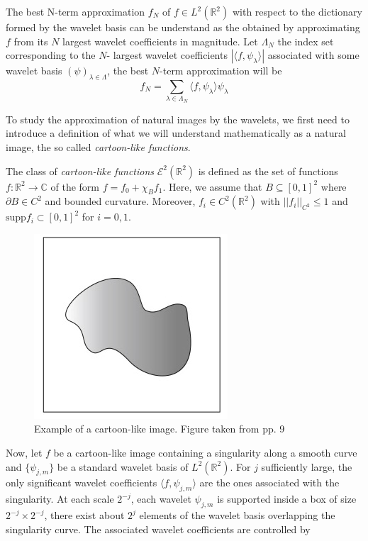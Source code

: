 \bigskip

The best N-term approximation $f_N$ of $f\in L^2(\mathbb{R}^2)$ with respect to the dictionary formed by the wavelet basis can be understand as the obtained by approximating $f$ from its $N$ largest wavelet coefficients in magnitude. Let $\Lambda_N$ the index set corresponding to the $N$- largest wavelet coefficients $|\langle f,\psi_{\lambda}\rangle|$ associated with some wavelet basis $(\psi)_{\lambda\in\Lambda}$, the best $N$-term approximation will be
$$
f_N=\sum_{\lambda\in\Lambda_N}\langle f,\psi_{\lambda}\rangle\psi_{\lambda}
$$

\bigskip

To study the approximation of natural images by the wavelets, we first need to introduce a definition of what we will understand mathematically as a natural image, the so called \textit{cartoon-like functions}.

\bigskip

\begin{defn}
The class of \textit{cartoon-like functions} $\mathcal{E}^2(\mathbb{R}^2)$ is defined as the set of functions $f:\mathbb{R}^2\longrightarrow \mathbb{C}$ of the form $f= f_0+\chi_B f_1$. Here, we assume that $B\subseteq [0,1]^2$ where $\partial B\in C^2$ and bounded curvature. Moreover, $f_i\in C^2(\mathbb{R}^2)$ with $||f_i||_{C^2}\leq 1$ and $\text{supp} f_i\subset [0,1]^2$ for $i=0,1$. 
\end{defn}

\bigskip

\begin{figure}[h!]
\centering
\includegraphics[width = 0.4 \textwidth]{./Diagrams/cartoon-like.jpg}
\caption{Example of a cartoon-like image. Figure taken from \cite{IntroShearlets} pp. 9}
\label{fig:cartoon-like}
\end{figure}

Now, let $f$ be a cartoon-like image containing a singularity along a smooth curve and $\{\psi_{j,m}\}$ be a standard wavelet basis of $L^2(\mathbb{R}^2)$. For $j$ sufficiently large, the only significant wavelet coefficients $\langle f,\psi_{ j,m}\rangle$ are the ones associated with the singularity. At each scale $2^{-j}$, each wavelet $\psi_{j,m}$ is supported inside a box of size $2^{-j}\times 2^{-j}$, there exist about $2^j$ elements of the wavelet basis overlapping the singularity curve. The associated wavelet coefficients are controlled by 

